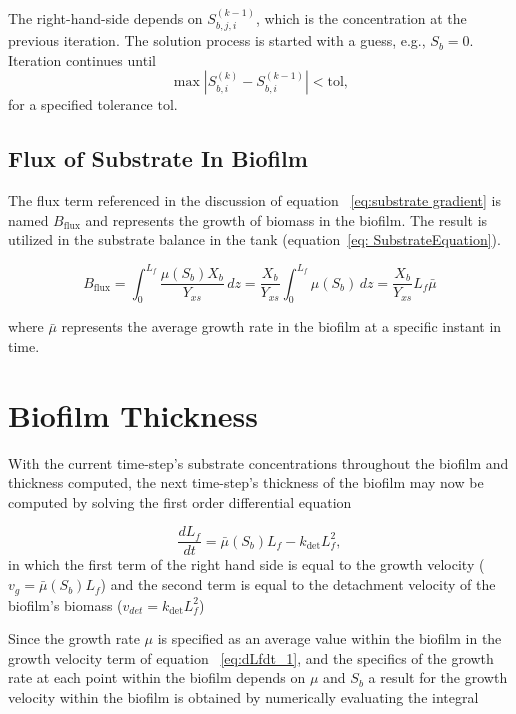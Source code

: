 \documentclass[letterpaper, twoside]{article}
\numberwithin{equation}{section}
\begin{document}
The right-hand-side depends on $S_{b,j,i}^{(k-1)}$, which is the concentration at the previous iteration.  The solution process is started with a guess, e.g., $S_b=0$. Iteration continues until
\begin{equation*}
  \max\left| S_{b,i}^{(k)} - S_{b,i}^{(k-1)} \right| < \mathrm{tol},
\end{equation*}
for a specified tolerance $\mathrm{tol}$.

\subsection{Flux of Substrate In Biofilm}
The flux term referenced in the discussion of equation ~\ref{eq:substrate gradient} is named $B_\mathrm{flux}$ and represents the growth of biomass in the biofilm. The result is utilized in the substrate balance in the tank (equation~\ref{eq: SubstrateEquation}).

\begin{equation} \label{eq:Bflux}
  B_\mathrm{flux} = \int_0^{L_f} \frac{\mu(S_b) X_b}{Y_{xs}} \, dz = \frac{ X_b}{Y_{xs}}\int_0^{L_f} \mu(S_b) \, dz = \frac{ X_b}{Y_{xs}} L_f \bar{\mu}
\end{equation}

where $\bar{\mu}$ represents the average growth rate in the biofilm at a specific instant in time.

\section{Biofilm Thickness}
With the current time-step's substrate concentrations throughout the biofilm and thickness computed, the next time-step's thickness of the biofilm may now be computed by solving the first order differential equation

\begin{equation}
  \label{eq:dLfdt_1}
  \frac{d L_f}{dt} = {\bar\mu(S_b) L_f}-{k_{\mathrm{det}}L_f^2},
\end{equation}
in which the first term of the right hand side is equal to the growth velocity ($v_g={\bar\mu(S_b) L_f}$) and the second term is equal to the detachment velocity of the biofilm's biomass ($v_{det}={k_{\mathrm{det}}L_f^2}$)

Since the growth rate $\mu$ is specified as an average value within the biofilm in the growth velocity term of equation ~\ref{eq:dLfdt_1}, and the specifics of the growth rate at each point within the biofilm depends on $\mu$ and $S_b$ a result for the growth velocity within the biofilm is obtained by numerically evaluating the integral 
\end{document}
